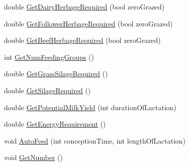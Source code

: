 \begin{DoxyCompactItemize}
\item 
double \hyperlink{classcattle_feeding_manager_a8d59a8ddd47dfd6a2870b6441d0d5b2c}{GetDairyHerbageRequired} (bool zeroGrazed)
\item 
double \hyperlink{classcattle_feeding_manager_aa1f06485a79e16288f2c99bb85f078b0}{GetFollowerHerbageRequired} (bool zeroGrazed)
\item 
double \hyperlink{classcattle_feeding_manager_aeca7402e3d5aa584a76ea3e89cc53cad}{GetBeefHerbageRequired} (bool zeroGrazed)
\item 
int \hyperlink{classcattle_feeding_manager_a625686a337bc7f33fcc6e71cc426da61}{GetNumFeedingGroups} ()
\item 
double \hyperlink{classcattle_feeding_manager_a695168c165996079ecd9f0735bb6de1e}{GetGrassSilageRequired} ()
\item 
double \hyperlink{classcattle_feeding_manager_a7bd08ef0fe270e8301f5c84cb5564ba3}{GetSilageRequired} ()
\item 
double \hyperlink{classcattle_feeding_manager_a27d81fb8607d248d56e5fff6dd39b4c0}{GetPotentialMilkYield} (int durationOfLactation)
\item 
double \hyperlink{classcattle_feeding_manager_aff0a92836f05091db4b82ef3ddb6fbb5}{GetEnergyRequirement} ()
\item 
void \hyperlink{classcattle_feeding_manager_afe78e7b55dc96e2301072429293e97b7}{AutoFeed} (int conceptionTime, int lengthOfLactation)
\item 
void \hyperlink{classcattle_feeding_manager_a738461cf54320bcc6d6522c8e5c85494}{GetNumber} ()
\end{DoxyCompactItemize}


